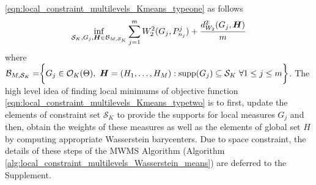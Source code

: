 \eqref{eqn:local_constraint_multilevels_Kmeans_typeone} as follows
\vspace{-6pt}
\begin{eqnarray}
\mathop {\inf }\limits_{\mathcal{S}_{K},G_{j} , \boldsymbol{H} \in \mathcal{B}_{M,\mathcal{S}_{K}}}{\mathop {\sum }\limits_{j=1}^{m}{W_{2}^{2}(G_{j},P_{n_{j}}^{j})}+\dfrac{d_{W_{2}}^{2}(G_{j},\boldsymbol{H})}{m}} \label{eqn:local_constraint_multilevels_Kmeans_typetwo}
\end{eqnarray}
where  $\mathcal{B}_{M,\mathcal{S}_{K}}=\biggr\{G_{j} \in \mathcal{O}_{K}(\Theta), \ \boldsymbol{H}=(H_{1},\ldots,H_{M}): 
\text{supp}(G_{j})\subseteq \mathcal{S}_{K}\ \forall 1 \leq j \leq m \biggr\}$. 
The high level idea of finding local minimums of objective function \eqref{eqn:local_constraint_multilevels_Kmeans_typetwo} 
is to first, update the elements of constraint set $\mathcal{S}_{K}$ to provide the 
supports for local measures $G_{j}$ and then, obtain the weights of these measures as 
well as the elements of global set $H$ by computing appropriate Wasserstein barycenters. 
Due to space constraint, the details of these steps of the MWMS Algorithm (Algorithm \ref{alg:local_constraint_multilevels_Wasserstein_means})
are deferred to the Supplement.

